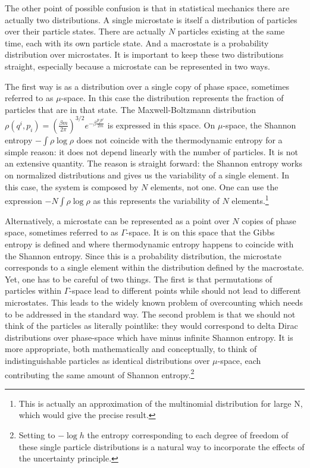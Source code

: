 \documentclass{article}
\begin{document}
The other point of possible confusion is that in statistical mechanics there are actually two distributions. A single microstate is itself a distribution of particles over their particle states. There are actually $N$ particles existing at the same time, each with its own particle state. And a macrostate is a probability distribution over microstates. It is important to keep these two distributions straight, especially because a microstate can be represented in two ways.

The first way is as a distribution over a single copy of phase space, sometimes referred to as $\mu$-space. In this case the distribution represents the fraction of particles that are in that state. The Maxwell-Boltzmann distribution $\rho(q^i, p_i) = \left(\frac{\beta m}{2\pi} \right)^{3/2}e^{-\beta \frac{p_ip^i}{2m}}$ is expressed in this space. On $\mu$-space, the Shannon entropy $-\int\rho \log \rho$ does not coincide with the thermodynamic entropy for a simple reason: it does not depend linearly with the number of particles. It is not an extensive quantity. The reason is straight forward: the Shannon entropy works on normalized distributions and gives us the variability of a single element. In this case, the system is composed by $N$ elements, not one. One can use the expression $-N\int\rho \log \rho$ as this represents the variability of $N$ elements.\footnote{This is actually an approximation of the multinomial distribution for large N, which would give the precise result.}

Alternatively, a microstate can be represented as a point over $N$ copies of phase space, sometimes referred to as $\Gamma$-space. It is on this space that the Gibbs entropy is defined and where thermodynamic entropy happens to coincide with the Shannon entropy. Since this is a probability distribution, the microstate corresponds to a single element within the distribution defined by the macrostate. Yet, one has to be careful of two things. The first is that permutations of particles within $\Gamma$-space lead to different points while should not lead to different microstates. This leads to the widely known problem of overcounting which needs to be addressed in the standard way. The second problem is that we should not think of the particles as literally pointlike: they would correspond to delta Dirac distributions over phase-space which have minus infinite Shannon entropy. It is more appropriate, both mathematically and conceptually, to think of indistinguishable particles as identical distributions over $\mu$-space, each contributing the same amount of Shannon entropy.\footnote{Setting to $-\log h$ the entropy corresponding to each degree of freedom of these single particle distributions is a natural way to incorporate the effects of the uncertainty principle.}
\end{document}
